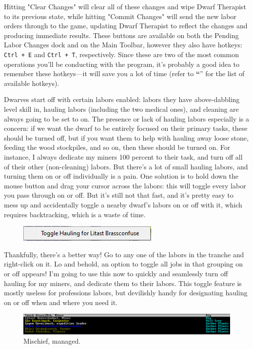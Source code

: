\documentclass[]{article}
\newcommand{\jump}[1] {\textbf{``\nameref{sec:#1}}''}
\begin{document}
\newpage
\noindent Hitting "Clear Changes" will clear all of these changes and wipe Dwarf Therapist to its
previous state, while hitting "Commit Changes" will send the new labor orders through to the game,
updating Dwarf Therapist to reflect the changes and producing immediate results. These buttons are
available on both the Pending Labor Changes dock and on the Main Toolbar, however they also have
hotkeys:
\texttt{Ctrl + E} and \texttt{Ctrl + T}, respectively. Since these are two of the most common operations
you'll be conducting with the program, it's probably a good idea to remember these hotkeys---it will save
you a lot of time (refer to \jump{Hotkeys} for the list of available hotkeys).

Dwarves start off with certain labors enabled: labors they have above-dabbling level skill in, hauling
labors (including the two medical ones), and cleaning are always going to be set to on. The presence or
lack of hauling labors especially is a concern: if we want the dwarf to be entirely focused on their
primary tasks, these should be turned off, but if you want them to help with hauling away loose stone,
feeding the wood stockpiles, and so on, then these should be turned on. For instance, I always dedicate
my miners 100 percent to their task, and turn off all of their other (non-cleaning) labors. But there's a
lot of small hauling labors, and turning them on or off individually is a pain.  One solution is to hold
down the mouse button and drag your cursor across the labors: this will toggle every labor you pass
through on or off. But it's still not that fast, and it's pretty easy to mess up and accidentally toggle
a nearby dwarf's labors on or off with it, which requires backtracking, which is a waste of time.

\begin{figure}
\vspace{-20pt}
  \begin{center}
    \includegraphics{Sec2Fig4}
  \end{center}
\vspace{-10pt}
\end{figure}
Thankfully, there's a better way! Go to any one of the labors in the tranche and right-click on it. Lo
and behold, an option to toggle all jobs in that grouping on or off appears! I'm going to use this now to
quickly and seamlessly turn off hauling for my miners, and dedicate them to their labors. This toggle
feature is mostly useless for professions labors, but devilishly handy for designating hauling on or off
when and where you need it.
\begin{figure}[h!] \centering \includegraphics[width=\linewidth]{Sec2Fig5}
\caption{Mischief, managed.}
\end{figure}
\end{document}
